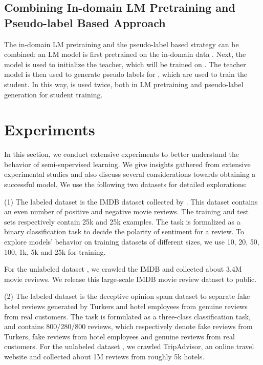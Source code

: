 \documentclass[11pt,a4paper]{article}
\begin{document}
\subsection{Combining In-domain LM Pretraining and Pseudo-label Based Approach}
The in-domain LM pretraining and the pseudo-label based strategy can be combined: 
an LM model is first pretrained on the in-domain data . Next, the model is used  to initialize the teacher, which will be trained on . 
The teacher model is then used to generate pseudo labels for , which are used to train the student.
In this way,  is used twice, both in LM pretraining and pseudo-label generation for student training.


\section{Experiments}
In this section, we conduct extensive experiments to better understand the behavior of semi-supervised learning. 
We give insights gathered from extensive experimental studies and also discuss several considerations towards obtaining  a successful model.
We use the following two  datasets for detailed explorations: 

(1) The labeled dataset  is the
 IMDB dataset collected by \citet{maas2011learning}. 
This dataset contains an even number of positive and
negative movie reviews. The training and test sets respectively contain 25k and 25k examples.
The task is formalized as a binary classification task to decide the polarity of sentiment for a review. 
To explore models' behavior on training datasets of different sizes, we use 10, 20, 50, 100, 1k, 5k and 25k for training. 

For the unlabeled dataset , we crawled the IMDB and collected about 3.4M movie reviews.
We release this large-scale IMDB movie review dataset  to public. 



(2) The labeled dataset  is the deceptive  opinion spam dataset \citep{ott-etal-2011-finding,li-etal-2014-towards} to 
separate fake hotel reviews generated by Turkers and hotel employees from genuine reviews from real customers.  
The task is formulated as a three-class classification task, and  
 contains 800/280/800 reviews, which respectively denote fake reviews from Turkers, fake reviews from hotel employees and genuine reviews from real customers.
For the unlabeled dataset , we crawled TripAdvisor, an online travel  website and collected about 1M reviews from roughly 5k hotels. 
\end{document}

